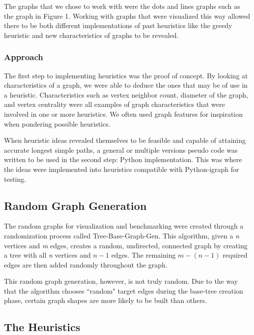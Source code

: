 \documentclass[twocolumn,showpacs,%
  nofootinbib,aps,superscriptaddress,%
  eqsecnum,prd,notitlepage,showkeys,11pt]{article}
\begin{document}
The graphs that we chose to work with were the dots and lines graphs such as the graph in Figure 1. Working with graphs that were visualized this way allowed there to be both different implementations of past heuristics like the greedy heuristic and new characteristics of graphs to be revealed.

\subsubsection{Approach}

The first step to implementing heuristics was the proof of concept. By looking at characteristics of a graph, we were able to deduce the ones that may be of use in a heuristic. Characteristics such as vertex neighbor count, diameter of the graph, and vertex centrality were all examples of graph characteristics that were involved in one or more heuristics. We often used graph features for inspiration when pondering possible heuristics.

When heuristic ideas revealed themselves to be feasible and capable of attaining accurate longest simple paths, a general or multiple versions pseudo code was written to be used in the second step: Python implementation. This was where the ideas were implemented into heuristics compatible with Python-igraph for testing. 

\subsection{Random Graph Generation}
The random graphs for visualization and benchmarking were created through a randomization process called Tree-Base-Graph-Gen. This algorithm, given a \emph{n} vertices and \emph{m} edges, creates a random, undirected, connected graph by creating a tree with all \emph{n} vertices and \(n-1\) edges. The remaining \(m - (n - 1)\) required edges are then added randomly throughout the graph.

This random graph generation, however, is not truly random. Due to the way that the algorithm chooses ``random" target edges during the base-tree creation phase, certain graph shapes are more likely to be built than others. 

\subsection{The Heuristics}
\end{document}
